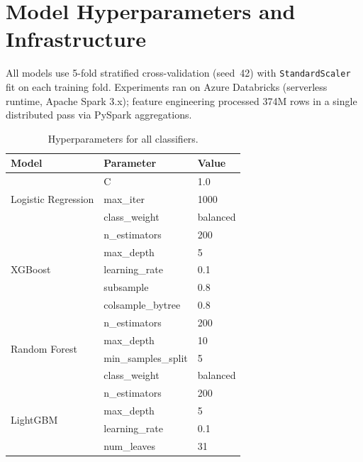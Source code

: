 \documentclass{article}
\begin{document}
\section{Model Hyperparameters and Infrastructure}
\label{app:hyperparams}

All models use 5-fold stratified cross-validation (seed~42) with
\texttt{StandardScaler} fit on each training fold.
Experiments ran on Azure Databricks (serverless runtime, Apache Spark
3.x); feature engineering processed 374M rows in a single distributed
pass via PySpark aggregations.

\begin{table}[h]
\caption{Hyperparameters for all classifiers.}
\label{tab:hyperparams}
\vskip 0.05in
\begin{center}
\begin{small}
\begin{tabular}{lll}
\toprule
Model & Parameter & Value \\
\midrule
\multirow{3}{*}{Logistic Regression}
  & C                  & 1.0 \\
  & max\_iter          & 1000 \\
  & class\_weight      & balanced \\
\midrule
\multirow{5}{*}{XGBoost}
  & n\_estimators      & 200 \\
  & max\_depth         & 5 \\
  & learning\_rate     & 0.1 \\
  & subsample          & 0.8 \\
  & colsample\_bytree  & 0.8 \\
\midrule
\multirow{4}{*}{Random Forest}
  & n\_estimators      & 200 \\
  & max\_depth         & 10 \\
  & min\_samples\_split & 5 \\
  & class\_weight      & balanced \\
\midrule
\multirow{4}{*}{LightGBM}
  & n\_estimators      & 200 \\
  & max\_depth         & 5 \\
  & learning\_rate     & 0.1 \\
  & num\_leaves        & 31 \\
\bottomrule
\end{tabular}
\end{small}
\end{center}
\vskip -0.1in
\end{table}
\end{document}
